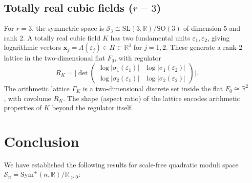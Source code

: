 \documentclass[12pt]{article}
\theoremstyle{definition}
\theoremstyle{remark}
\newcommand{\R}{\mathbb{R}}
\newcommand{\SL}{\mathrm{SL}}
\newcommand{\SO}{\mathrm{SO}}
\newcommand{\Symp}{\mathrm{Sym}^{+}}
\newcommand{\calM}{\mathcal{S}}
\begin{document}
\subsection{Totally real cubic fields ($r = 3$)}

For $r = 3$, the symmetric space is $\calM_3 \cong \SL(3,\R)/\SO(3)$
of dimension $5$ and rank $2$.
A totally real cubic field $K$ has two fundamental units
$\varepsilon_1, \varepsilon_2$, giving logarithmic vectors
$\mathbf{x}_j = \Lambda(\varepsilon_j) \in H \subset \R^3$ for $j=1,2$.
These generate a rank-$2$ lattice in the two-dimensional flat $F_0$,
with regulator
\[
  R_K = \bigl|\det\begin{pmatrix}
    \log|\sigma_1(\varepsilon_1)| & \log|\sigma_1(\varepsilon_2)| \\
    \log|\sigma_2(\varepsilon_1)| & \log|\sigma_2(\varepsilon_2)|
  \end{pmatrix}\bigr|.
\]
The arithmetic lattice $\Gamma_K$ is a two-dimensional discrete set
inside the flat $F_0 \cong \R^2$, with covolume $R_K$.
The shape (aspect ratio) of the lattice encodes arithmetic properties
of $K$ beyond the regulator itself.

\section{Conclusion}
\label{sec:conclusion}

We have established the following results for scale-free quadratic
moduli space $\calM_n = \Symp(n,\R)/\R_{>0}$:
\end{document}

